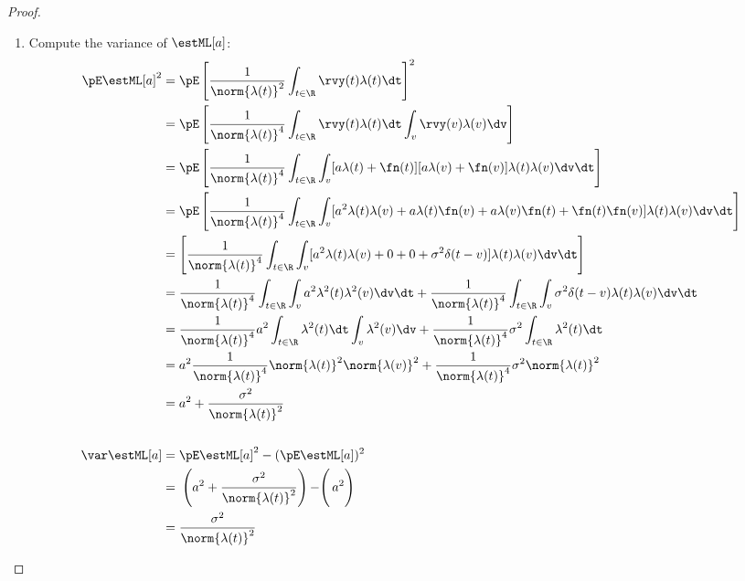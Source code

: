 \begin{proposition}
\begin{proof}
\begin{enumerate}
\item Compute the variance of $\estML[a]$:
\begin{align*}
  \pE \estML[a]^2
    &= \pE \left[ \frac{1}{\norm{\lambda(t)}^2} \int_{t\in\R} \rvy(t)\lambda(t) \dt\right]^2
  \\&= \pE \left[  \frac{1}{\norm{\lambda(t)}^4}
        \int_{t\in\R} \rvy(t)\lambda(t) \dt \int_v \rvy(v)\lambda(v) \dv
        \right]
  \\&= \pE \left[  \frac{1}{\norm{\lambda(t)}^4}
        \int_{t\in\R} \int_v [a\lambda(t) + \fn(t)][a\lambda(v) + \fn(v)]
        \lambda(t) \lambda(v)
        \dv\dt \right]
  \\&= \pE \left[  \frac{1}{\norm{\lambda(t)}^4}
        \int_{t\in\R} \int_v
        [a^2\lambda(t)\lambda(v) + a\lambda(t)\fn(v) + a\lambda(v)\fn(t) + \fn(t)\fn(v)]
        \lambda(t) \lambda(v)
        \dv\dt \right]
  \\&= \left[  \frac{1}{\norm{\lambda(t)}^4}
        \int_{t\in\R} \int_v
        [a^2\lambda(t)\lambda(v) + 0 + 0 + \sigma^2\delta(t-v)]
        \lambda(t) \lambda(v)
        \dv\dt \right]
  \\&= \frac{1}{\norm{\lambda(t)}^4}
        \int_{t\in\R} \int_v a^2\lambda^2(t)\lambda^2(v) \dv\dt +
        \frac{1}{\norm{\lambda(t)}^4}
        \int_{t\in\R} \int_v \sigma^2\delta(t-v) \lambda(t) \lambda(v) \dv\dt
  \\&= \frac{1}{\norm{\lambda(t)}^4}
        a^2 \int_{t\in\R} \lambda^2(t) \dt \int_v \lambda^2(v) \dv +
        \frac{1}{\norm{\lambda(t)}^4}
        \sigma^2\int_{t\in\R} \lambda^2(t) \dt
  \\&= a^2 \frac{1}{\norm{\lambda(t)}^4}
        \norm{\lambda(t)}^2 \norm{\lambda(v)}^2 +
        \frac{1}{\norm{\lambda(t)}^4}
        \sigma^2 \norm{\lambda(t)}^2
  \\&= a^2 + \frac{\sigma^2}{\norm{\lambda(t)}^2}
\\
\\
  \var\estML[a]
    &= \pE \estML[a]^2 - (\pE \estML[a])^2
  \\&= \left.\left.\left(a^2 + \frac{\sigma^2}{\norm{\lambda(t)}^2}\right) - \right( a^2 \right)
  \\&= \frac{\sigma^2}{\norm{\lambda(t)}^2}
\end{align*}


\end{enumerate}
\end{proof}
\end{proposition}
